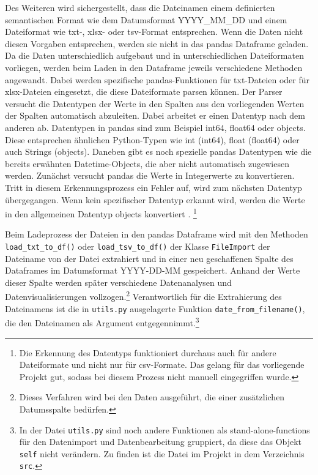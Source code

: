     Des Weiteren wird sichergestellt, dass die Dateinamen einem definierten semantischen Format wie dem Datumsformat YYYY\_MM\_DD und 
    einem Dateiformat wie txt-, xlsx- oder tsv-Format entsprechen. Wenn die Daten nicht diesen Vorgaben entsprechen, werden sie nicht in
    das pandas Dataframe geladen. Da die Daten unterschiedlich aufgebaut und in unterschiedlichen Dateiformaten vorliegen, 
    werden beim Laden in den Dataframe jeweils verschiedene Methoden angewandt. Dabei werden spezifische pandas-Funktionen für 
    txt-Dateien oder für xlsx-Dateien eingesetzt, die diese Dateiformate parsen können. 
    Der Parser versucht die Datentypen der Werte in den Spalten aus den vorliegenden Werten der Spalten automatisch abzuleiten. 
    Dabei arbeitet er einen Datentyp nach dem anderen ab. Datentypen in pandas sind zum Beispiel int64, float64 oder objects. 
    Diese entsprechen ähnlichen Python-Typen wie int (int64), float (float64) oder auch Strings (objects). Daneben gibt es noch spezielle pandas Datentypen wie die bereits erwähnten Datetime-Objects, die aber nicht automatisch zugewiesen werden.
    Zunächst versucht pandas die Werte in Integerwerte zu konvertieren. Tritt in diesem Erkennungsprozess ein Fehler auf, 
    wird zum nächsten Datentyp übergegangen. Wenn kein spezifischer Datentyp erkannt wird, werden die Werte in den allgemeinen Datentyp objects konvertiert \cite[vgl.][]{golubin_how_2021}.
    \footnote{ Die Erkennung des Datentyps funktioniert durchaus auch für andere Dateiformate und nicht nur für csv-Formate. Das gelang für das vorliegende Projekt gut, sodass
    bei diesem Prozess nicht manuell eingegriffen wurde.}
    
    Beim Ladeprozess der Dateien in den pandas Dataframe wird mit den Methoden \texttt{load\_txt\_to\_df()} oder \texttt{load\_tsv\_to\_df()} 
    der Klasse \texttt{FileImport} der Dateiname von der Datei extrahiert und in einer neu geschaffenen Spalte des Dataframes im Datumsformat YYYY-DD-MM gespeichert.
    Anhand der Werte dieser Spalte werden später verschiedene Datenanalysen und Datenvisualisierungen vollzogen.\footnote{ Dieses Verfahren wird bei den Daten ausgeführt, die einer zusätzlichen Datumsspalte bedürfen.} 
    Verantwortlich für die Extrahierung des Dateinamens ist die in \texttt{utils.py} ausgelagerte Funktion \texttt{date\_from\_filename()},
    die den Dateinamen als Argument entgegennimmt.\footnote{ In der Datei \texttt{utils.py} sind noch andere Funktionen als stand-alone-functions für den Datenimport und Datenbearbeitung gruppiert,
    da diese das Objekt \texttt{self} nicht verändern. Zu finden ist die Datei im Projekt in dem Verzeichnis \texttt{src}.} 
    
